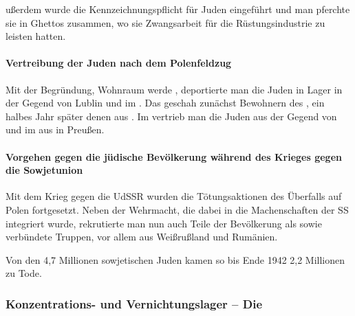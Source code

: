 ußerdem wurde die Kennzeichnungspflicht für Juden eingeführt und
man pferchte sie in Ghettos zusammen, wo sie Zwangsarbeit für die
Rüstungsindustrie zu leisten hatten.

\paragraph{Vertreibung der Juden nach dem Polenfeldzug}
Mit der Begründung, Wohnraum werde , deportierte man die Juden in Lager
in der Gegend von Lublin und im . Das geschah
zunächst Bewohnern des , ein halbes Jahr später
denen aus . Im  vertrieb man die
Juden aus der Gegend von  und im  aus
 in Preußen.

\paragraph{Vorgehen gegen die jüdische Bevölkerung während des
Krieges gegen die Sowjetunion}
Mit dem Krieg gegen die UdSSR wurden die Tötungsaktionen des Überfalls
auf Polen fortgesetzt. Neben der Wehrmacht, die dabei in die
Machenschaften der SS integriert wurde, rekrutierte man nun auch Teile
der Bevölkerung als  sowie verbündete
Truppen, vor allem aus Weißrußland und Rumänien.

Von den 4,7 Millionen sowjetischen Juden kamen so bis Ende 1942 2,2
Millionen zu Tode.


\subsubsection{Konzentrations- und Vernichtungslager -- Die
}
\label{sss:konz-vern-endl}

